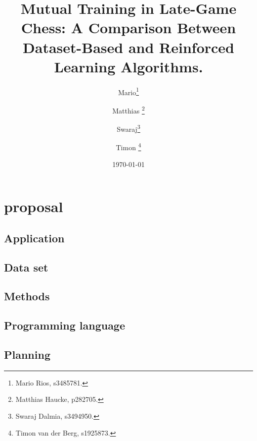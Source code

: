 \documentclass[10pt]{report}
\title{Mutual Training in Late-Game Chess: A Comparison Between Dataset-Based
and Reinforced Learning Algorithms.}
\author{Mario\footnote{Mario Rios, s3485781.} \and Matthias \footnote{Matthias Haucke,
p282705.}
\and Swaraj\footnote{Swaraj Dalmia, s3494950.} \and Timon \footnote{Timon van
der Berg, s1925873.}}
\date{\today}
\begin{document}
\maketitle

\section{proposal}
\subsection{Application}
    
\subsection{Data set}
%    
\subsection{Methods}
    
\subsection{Programming language}
    
\subsection{Planning}
    



\begin{thebibliography}{99}

\end{thebibliography}
\end{document}
